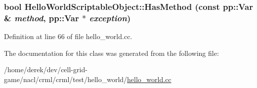 \hypertarget{class_hello_world_scriptable_object_a0af23165c74483e47f97877cbb51e79a}{
\subsubsection[{HasMethod}]{\setlength{\rightskip}{0pt plus 5cm}bool HelloWorldScriptableObject::HasMethod (const pp::Var \& {\em method}, \/  pp::Var $\ast$ {\em exception})}}
\label{class_hello_world_scriptable_object_a0af23165c74483e47f97877cbb51e79a}


Definition at line 66 of file hello\_\-world.cc.



The documentation for this class was generated from the following file:\begin{DoxyCompactItemize}
\item 
/home/derek/dev/cell-\/grid-\/game/nacl/crml/crml/test/hello\_\-world/\hyperlink{hello__world_8cc}{hello\_\-world.cc}\end{DoxyCompactItemize}
